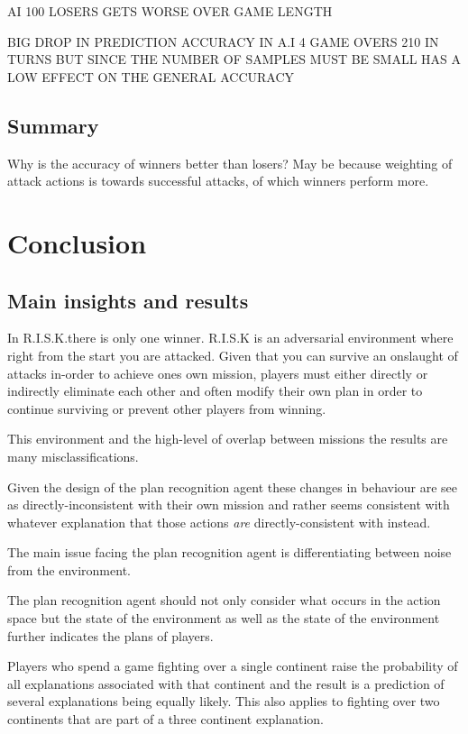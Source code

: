 \documentclass[parskip]{cs4rep}
\begin{document}
AI 100 LOSERS GETS WORSE OVER GAME LENGTH

BIG DROP IN PREDICTION ACCURACY IN A.I 4 GAME OVERS 210 IN TURNS BUT SINCE THE NUMBER OF SAMPLES MUST BE SMALL HAS A LOW EFFECT ON THE GENERAL ACCURACY

\section{Summary}

Why is the accuracy of winners better than losers? May be because weighting of attack actions is towards successful attacks, of which winners perform more.

\chapter{Conclusion}

\section{Main insights and results}

In R.I.S.K.there is only one winner. R.I.S.K is an adversarial environment where right from the start you are attacked. Given that you can survive an onslaught of attacks in-order to achieve ones own mission, players must either directly or indirectly eliminate each other and often modify their own plan in order to continue surviving or prevent other players from winning. 

This environment and the high-level of overlap between missions the results are many misclassifications.

Given the design of the plan recognition agent these changes in behaviour are see as directly-inconsistent with their own mission and rather seems consistent with whatever explanation that those actions \textit{are} directly-consistent with instead.

The main issue facing the plan recognition agent is differentiating between noise from the environment.

The plan recognition agent should not only consider what occurs in the action space but the state of the environment as well as the state of the environment further indicates the plans of players.

Players who spend a game fighting over a single continent raise the probability of all explanations associated with that continent and the result is a prediction of several explanations being equally likely. This also applies to fighting over two continents that are part of a three continent explanation.
\end{document}
